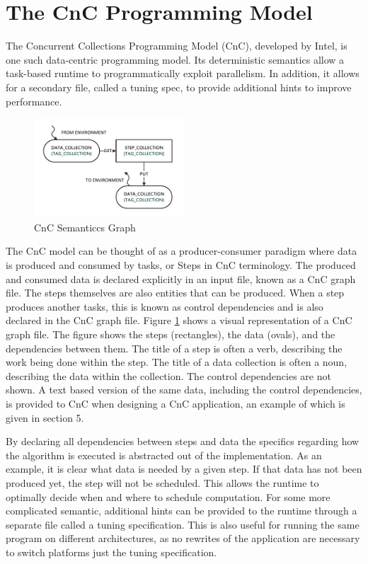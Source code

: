 \section{The CnC Programming Model}

The Concurrent Collections Programming Model (CnC), developed by Intel, is one such data-centric programming model.  Its deterministic semantics allow a task-based runtime to programmatically exploit parallelism.  In addition, it allows for a secondary file, called a tuning spec, to provide additional hints to improve performance.

\begin{figure}[!htb]
  \centering
  \includegraphics[width=0.5\textwidth]{drawings/CnCExample.pdf}
  \caption{CnC Semanticcs Graph}
  \label{fig:cnc_graph}
\end{figure}

The CnC model can be thought of as a producer-consumer paradigm where data is produced and consumed by tasks, or Steps in CnC terminology.  The produced and consumed data is declared explicitly in an input file, known as a CnC graph file.  The steps themselves are also entities that can be produced.  When a step produces another tasks, this is known as control dependencies and is also declared in the CnC graph file.  Figure \ref{fig:cnc_graph} shows a visual representation of a CnC graph file.  The figure shows the steps (rectangles), the data (ovals), and the dependencies between them.  The title of a step is often a verb, describing the work being done within the step.  The title of a data collection is often a noun, describing the data within the collection.  The control dependencies are not shown.  A text based version of the same data, including the control dependencies, is provided to CnC when designing a CnC application, an example of which is given in section 5.

By declaring all dependencies between steps and data the specifics regarding how the algorithm is executed is  abstracted out of the implementation.  As an example, it is clear what data is needed by a given step.  If that data has not been produced yet, the step will not be scheduled.  This allows the runtime to optimally decide when and where to schedule computation. For some more complicated semantic, additional hints can be provided to the runtime through a separate file called a tuning specification.  This is also useful for running the same program on different architectures, as no rewrites of the application are necessary to switch platforms just the tuning specification. 

